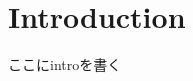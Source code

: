 \documentclass[main]{subfiles}
\begin{document}
\chapter*{Introduction}
ここにintroを書く\cite{ref:mnih2013playing}
\end{document}
